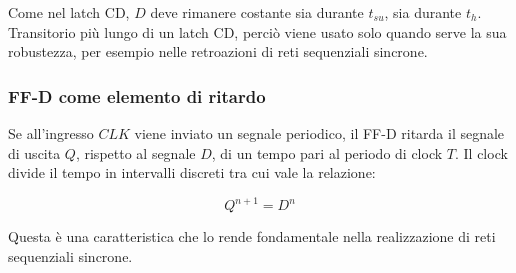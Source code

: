 \documentclass{subfiles}
\begin{document}
\noindent
Come nel latch CD, $D$ deve rimanere costante sia durante $t_{su}$, sia durante $t_h$.
Transitorio più lungo di un latch CD, perciò viene usato solo quando serve la sua robustezza, per esempio nelle retroazioni di reti sequenziali sincrone.

\subsubsection{FF-D come elemento di ritardo}

Se all'ingresso $CLK$ viene inviato un segnale periodico, il FF-D ritarda il segnale di uscita $Q$, rispetto al segnale $D$, di un tempo pari al periodo di clock $T$.
Il clock divide il tempo in intervalli discreti tra cui vale la relazione:

$$
Q^{n+1} = D^{n}
$$

\noindent
Questa è una caratteristica che lo rende fondamentale nella realizzazione di reti sequenziali sincrone.
\end{document}
